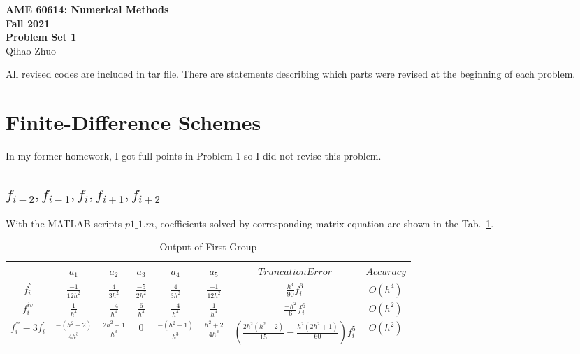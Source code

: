 \documentclass[letterpaper,10pt]{article}
\begin{document}
\fancyhf{}
\fancyfoot[C]{\thepage}

\thispagestyle{plain}
\begin{center}
  \large
  \textbf{AME 60614: Numerical Methods} \\
  \textbf{Fall 2021} \\
  \vspace{0.5em}
  \textbf{Problem Set 1} \\
  \vspace{1em}
  Qihao Zhuo
\end{center}

\vspace{1.5em}

All revised codes are included in tar file. There are statements describing which parts were revised 
at the beginning of each problem. 

\section{Finite-Difference Schemes}\label{sec1}
In my former homework, I got full points in Problem 1 so I did not revise this problem. 
\subsection{$f_{i-2},f_{i-1},f_{i},f_{i+1},f_{i+2}$}
With the MATLAB scripts $p1\_1.m$, coefficients solved by corresponding matrix equation are shown in the Tab.~\ref{tab1_1}.  
\begin{table}[htbp]
  \centering  
  \caption{Output of First Group}\label{tab1_1}
  \begin{tabular}{cccccccc}
    \hline
    & $a_1$ & $a_2$ & $a_3$ & $a_4$& $a_5$ & $Truncation Error$& $Accuracy$\\
    \hline
    $f_{i}^{''}$ & $\frac{-1}{12h^2}$ & $\frac{4}{3h^2}$ & $\frac{-5}{2h^2}$ & $\frac{4}{3h^2}$ & $\frac{-1}{12h^2}$ & $\frac{h^4}{90}f_{i}^{6}$& $O\left(h^4\right)$\\
    $f_{i}^{iv}$ & $\frac{1}{h^4}$ & $\frac{-4}{h^4}$ & $\frac{6}{h^4}$ & $\frac{-4}{h^4}$ & $\frac{1}{h^4}$ & $\frac{-h^2}{6}f_{i}^{6}$& $O\left(h^2\right)$\\
    $f_{i}^{'''}-3f_{i}^{'}$ & $\frac{-\left(h^2+2\right)}{4h^3}$ & $\frac{2h^2+1}{h^3}$ & 0 & $\frac{-\left(h^2+1\right)}{h^3}$ & $\frac{h^2+2}{4h^3}$ & $\left(\frac{2h^2(h^2 + 2)}{15} - \frac{h^2(2h^2 + 1)}{60}\right)f_{i}^{5}$&$O\left(h^2\right)$\\
    \hline
  \end{tabular}
\end{table}
\end{document}

